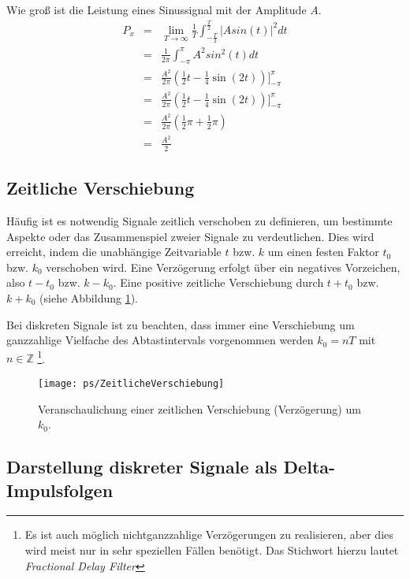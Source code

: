 \begin{example} Wie groß ist die Leistung eines Sinussignal mit der Amplitude $A$.
\begin{eqnarray}
    P_x & = & \lim_{T\rightarrow \infty} \frac{1}{T} \int_{-\frac{T}{2}}^{\frac{T}{2}} |A sin(t)|^2 dt\\
    & = & \frac{1}{2\pi} \int_{-\pi}^{\pi} A^2 sin^2(t) dt\\
    & = & \frac{A^2}{2\pi} \left( \frac{1}{2}t - \frac{1}{4} \sin (2t) \right)\Bigg]_{-\pi}^{\pi}\\
    & = & \frac{A^2}{2\pi} \left( \frac{1}{2}t - \frac{1}{4} \sin (2t)\right)\Bigg]_{-\pi}^{\pi} \\
    & = & \frac{A^2}{2\pi} \left( \frac{1}{2} \pi + \frac{1}{2} \pi \right) \\
    & = & \frac{A^2}{2}
\end{eqnarray}
\end{example}

\subsection{Zeitliche Verschiebung}
Häufig ist es notwendig Signale zeitlich verschoben zu definieren, um bestimmte Aspekte oder
das Zusammenspiel zweier Signale zu verdeutlichen. Dies wird erreicht, indem die unabhängige Zeitvariable
$t$ bzw. $k$ um einen festen Faktor $t_0$ bzw. $k_0$ verschoben wird. Eine Verzögerung erfolgt über ein
negatives Vorzeichen, also $t-t_0$ bzw. $k-k_0$. Eine positive zeitliche Verschiebung durch $t+t_0$ bzw.
$k+k_0$ (siehe Abbildung \ref{pic:VerschobenesRechteck}).

Bei diskreten Signale ist zu beachten, dass immer eine Verschiebung
um ganzzahlige Vielfache des Abtastintervals vorgenommen werden $k_0 = nT$ mit
$n \in \mathbb{Z}$
\footnote{Es ist auch möglich
nichtganzzahlige Verzögerungen zu realisieren, aber dies wird meist nur in sehr
speziellen Fällen benötigt. Das Stichwort hierzu lautet {\em Fractional Delay Filter}}.

\begin{figure}[h]
\begin{center}
\texttt{[image: ps/ZeitlicheVerschiebung]}
\caption{\label{pic:VerschobenesRechteck} Veranschaulichung einer zeitlichen Verschiebung (Verzögerung)
um $k_0$.}
\end{center}
\end{figure}

\subsection{Darstellung diskreter Signale als Delta-Impulsfolgen}

